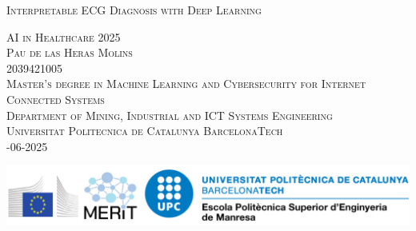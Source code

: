 \begin{center}
 
\textsc{\Huge Interpretable ECG Diagnosis with Deep Learning}

\bigskip
\bigskip

\textsc{\large
AI in Healthcare 2025\\
%
\bigskip
\bigskip
Pau de las Heras Molins\\
%
2039421005\\
%
\bigskip
\bigskip
Master's degree in Machine Learning and Cybersecurity for Internet Connected Systems \\
%
\bigskip
\bigskip
%
Department of Mining, Industrial and ICT Systems Engineering\\
%
Universitat Politecnica de Catalunya BarcelonaTech\\
%
\bigskip
{}-06-2025
}


\vfill

\includegraphics[width=.5\paperwidth]{titlepage-media/MERIT-UPC-LOGO.jpg} 
 
\vfill




\end{center}
